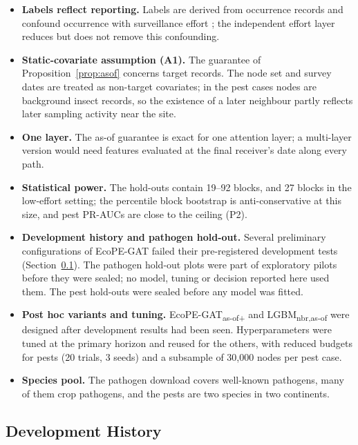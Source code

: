 \documentclass[a4paper,fleqn]{cas-sc}
\newcommand{\Masofplus}{\mbox{EcoPE-GAT\textsubscript{as-of+}}}
\newcommand{\Lasof}{\mbox{LGBM\textsubscript{nbr,as-of}}}
\begin{document}
\begin{itemize}[leftmargin=1.4em]
  \item \textbf{Labels reflect reporting.} Labels are derived from occurrence records and confound occurrence with surveillance effort \citep{beck2014}; the independent effort layer reduces but does not remove this confounding.
  \item \textbf{Static-covariate assumption (A1).} The guarantee of Proposition~\ref{prop:asof} concerns target records. The node set and survey dates are treated as non-target covariates; in the pest cases nodes are background insect records, so the existence of a later neighbour partly reflects later sampling activity near the site.
  \item \textbf{One layer.} The as-of guarantee is exact for one attention layer; a multi-layer version would need features evaluated at the final receiver's date along every path.
  \item \textbf{Statistical power.} The hold-outs contain 19--92 blocks, and 27 blocks in the low-effort setting; the percentile block bootstrap is anti-conservative at this size, and pest PR-AUCs are close to the ceiling (P2).
  \item \textbf{Development history and pathogen hold-out.} Several preliminary configurations of EcoPE-GAT failed their pre-registered development tests (Section~\ref{sec:history}). The pathogen hold-out plots were part of exploratory pilots before they were sealed; no model, tuning or decision reported here used them. The pest hold-outs were sealed before any model was fitted.
  \item \textbf{Post hoc variants and tuning.} \Masofplus{} and \Lasof{} were designed after development results had been seen. Hyperparameters were tuned at the primary horizon and reused for the others, with reduced budgets for pests (20 trials, 3 seeds) and a subsample of 30{,}000 nodes per pest case.
  \item \textbf{Species pool.} The pathogen download covers \gbifSpecies{} well-known pathogens, many of them crop pathogens, and the pests are two species in two continents.
\end{itemize}

\subsection{Development History}
\label{sec:history}
\end{document}
